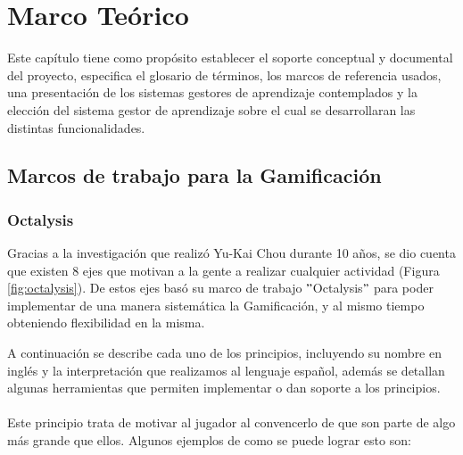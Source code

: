 \chapter{Marco Teórico}
\label{ch:marcoTeorico}

Este capítulo tiene como propósito establecer el soporte conceptual y documental del proyecto, especifica el glosario de términos, los marcos de referencia usados, una presentación de los sistemas gestores de aprendizaje contemplados y la elección del sistema gestor de aprendizaje sobre el cual se desarrollaran las distintas funcionalidades.

\section{Marcos de trabajo para la Gamificación}
\subsection{Octalysis}
\label{sec:octalysis}

    Gracias a la investigación que realizó Yu-Kai Chou durante 10 años, se dio cuenta que existen 8 ejes que motivan a la gente a realizar cualquier actividad (Figura \ref{fig:octalysis}). De estos ejes basó su marco de trabajo $"$Octalysis$"$ para poder implementar de una manera sistemática la Gamificación, y al mismo tiempo obteniendo flexibilidad en la misma.
    
    
\noindent A continuación se describe cada uno de los principios, incluyendo su nombre en inglés y la interpretación que realizamos al lenguaje español, además se detallan algunas herramientas que permiten implementar o dan soporte a los principios.
    
    \subsubsection{\principioI}
    \label{subsec:principioI}
  
    Este principio trata de motivar al jugador al convencerlo de que son parte de algo más grande que ellos.\cite[p. 66]{libro2} Algunos ejemplos de como se puede lograr esto son:
    
